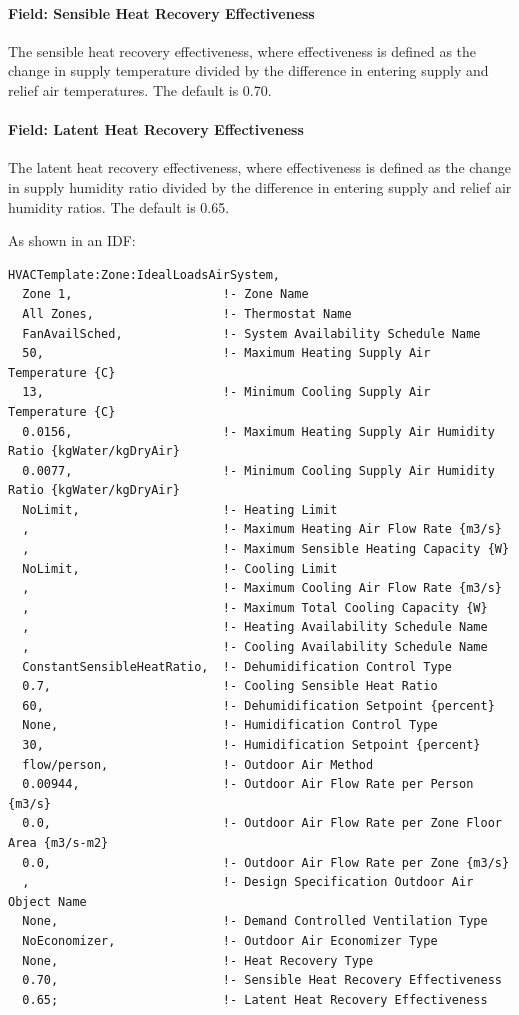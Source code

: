 \paragraph{Field: Sensible Heat Recovery Effectiveness}\label{field-sensible-heat-recovery-effectiveness}

The sensible heat recovery effectiveness, where effectiveness is defined as the change in supply temperature divided by the difference in entering supply and relief air temperatures. The default is 0.70.

\paragraph{Field: Latent Heat Recovery Effectiveness}\label{field-latent-heat-recovery-effectiveness}

The latent heat recovery effectiveness, where effectiveness is defined as the change in supply humidity ratio divided by the difference in entering supply and relief air humidity ratios. The default is 0.65.

As shown in an IDF:

\begin{lstlisting}
HVACTemplate:Zone:IdealLoadsAirSystem,
  Zone 1,                     !- Zone Name
  All Zones,                  !- Thermostat Name
  FanAvailSched,              !- System Availability Schedule Name
  50,                         !- Maximum Heating Supply Air Temperature {C}
  13,                         !- Minimum Cooling Supply Air Temperature {C}
  0.0156,                     !- Maximum Heating Supply Air Humidity Ratio {kgWater/kgDryAir}
  0.0077,                     !- Minimum Cooling Supply Air Humidity Ratio {kgWater/kgDryAir}
  NoLimit,                    !- Heating Limit
  ,                           !- Maximum Heating Air Flow Rate {m3/s}
  ,                           !- Maximum Sensible Heating Capacity {W}
  NoLimit,                    !- Cooling Limit
  ,                           !- Maximum Cooling Air Flow Rate {m3/s}
  ,                           !- Maximum Total Cooling Capacity {W}
  ,                           !- Heating Availability Schedule Name
  ,                           !- Cooling Availability Schedule Name
  ConstantSensibleHeatRatio,  !- Dehumidification Control Type
  0.7,                        !- Cooling Sensible Heat Ratio
  60,                         !- Dehumidification Setpoint {percent}
  None,                       !- Humidification Control Type
  30,                         !- Humidification Setpoint {percent}
  flow/person,                !- Outdoor Air Method
  0.00944,                    !- Outdoor Air Flow Rate per Person {m3/s}
  0.0,                        !- Outdoor Air Flow Rate per Zone Floor Area {m3/s-m2}
  0.0,                        !- Outdoor Air Flow Rate per Zone {m3/s}
  ,                           !- Design Specification Outdoor Air Object Name
  None,                       !- Demand Controlled Ventilation Type
  NoEconomizer,               !- Outdoor Air Economizer Type
  None,                       !- Heat Recovery Type
  0.70,                       !- Sensible Heat Recovery Effectiveness
  0.65;                       !- Latent Heat Recovery Effectiveness
\end{lstlisting}

